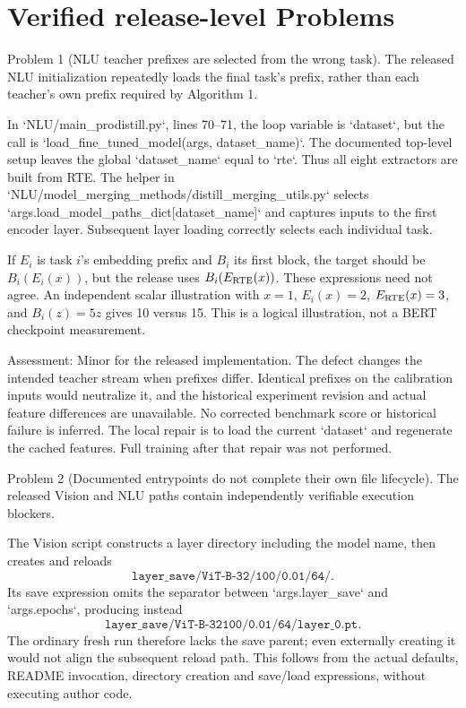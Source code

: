 \documentclass[10pt]{article}
\begin{document}
\section*{Verified release-level Problems}
Problem 1 (NLU teacher prefixes are selected from the wrong task).  The released NLU initialization repeatedly loads the final task’s prefix, rather than each teacher’s own prefix required by Algorithm 1.\par
In `NLU/main\_prodistill.py`, lines 70–71, the loop variable is `dataset`, but the call is `load\_fine\_tuned\_model(args, dataset\_name)`. The documented top-level setup leaves the global `dataset\_name` equal to `rte`. Thus all eight extractors are built from RTE. The helper in `NLU/model\_merging\_methods/distill\_merging\_utils.py` selects `args.load\_model\_paths\_dict[dataset\_name]` and captures inputs to the first encoder layer. Subsequent layer loading correctly selects each individual task.\par
If \(E_i\) is task \(i\)’s embedding prefix and \(B_i\) its first block, the target should be \(B_i(E_i(x))\), but the release uses \(B_i(E_{\rm RTE}(x))\). These expressions need not agree. An independent scalar illustration with \(x=1\), \(E_i(x)=2\), \(E_{\rm RTE}(x)=3\), and \(B_i(z)=5z\) gives 10 versus 15. This is a logical illustration, not a BERT checkpoint measurement.\par
Assessment: Minor for the released implementation. The defect changes the intended teacher stream when prefixes differ. Identical prefixes on the calibration inputs would neutralize it, and the historical experiment revision and actual feature differences are unavailable. No corrected benchmark score or historical failure is inferred. The local repair is to load the current `dataset` and regenerate the cached features. Full training after that repair was not performed.\par
Problem 2 (Documented entrypoints do not complete their own file lifecycle).  The released Vision and NLU paths contain independently verifiable execution blockers.\par
The Vision script constructs a layer directory including the model name, then creates and reloads \[\texttt{layer\_save/ViT-B-32/100/0.01/64/}.\] Its save expression omits the separator between `args.layer\_save` and `args.epochs`, producing instead \[\texttt{layer\_save/ViT-B-32100/0.01/64/layer\_0.pt}.\] The ordinary fresh run therefore lacks the save parent; even externally creating it would not align the subsequent reload path. This follows from the actual defaults, README invocation, directory creation and save/load expressions, without executing author code.\par
\end{document}
